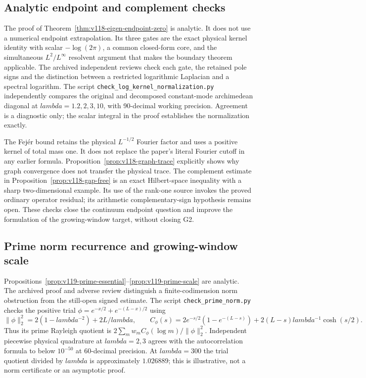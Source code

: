 \documentclass[11pt]{article}
\def\lambda{lambda}%
\theoremstyle{remark}
\begin{document}
\subsection{Analytic endpoint and complement checks}
The proof of Theorem~\ref{thm:v118-eigen-endpoint-zero} is analytic.
It does not use a numerical endpoint extrapolation. Its three gates are
the exact physical kernel identity with scalar $-\log(2\pi)$, a common
closed-form core, and the simultaneous $L^2/L^\infty$ resolvent argument
that makes the boundary theorem applicable. The archived independent
reviews check each gate, the retained pole signs and the distinction
between a restricted logarithmic Laplacian and a spectral logarithm.
The script \texttt{check\_log\_kernel\_normalization.py} independently
compares the original and decomposed constant-mode archimedean diagonal
at $\lambda=1.2,2,3,10$, with 90-decimal working precision. Agreement is
a diagnostic only; the scalar integral in the proof establishes the
normalization exactly.

The Fej\'er bound retains the physical $L^{-1/2}$ Fourier factor and
uses a positive kernel of total mass one. It does not replace the
paper's literal Fourier cutoff in any earlier formula.
Proposition~\ref{prop:v118-graph-trace} explicitly shows why graph
convergence does not transfer the physical trace.
The complement estimate in Proposition~\ref{prop:v118-gap-free}
is an exact Hilbert-space inequality with a sharp two-dimensional
example. Its use of the rank-one source invokes the proved ordinary
operator residual; its arithmetic complementary-sign hypothesis remains
open. These checks close the continuum endpoint question and improve
the formulation of the growing-window target, without closing G2.


\subsection{Prime norm recurrence and growing-window scale}
Propositions~\ref{prop:v119-prime-essential}--\ref{prop:v119-prime-scale}
are analytic. The archived proof and adverse review distinguish a
finite-codimension norm obstruction from the still-open signed estimate.
The script \texttt{check\_prime\_norm.py} checks the positive trial
$\phi=e^{-x/2}+e^{-(L-x)/2}$ using
\[
 \|\phi\|_2^2=2(1-\lambda^{-2})+2L/\lambda,
 \qquad
 C_\phi(s)=2e^{-s/2}(1-e^{-(L-s)})
             +2(L-s)\lambda^{-1}\cosh(s/2).
\]
Thus its prime Rayleigh quotient is
$2\sum_m w_m C_\phi(\log m)/\|\phi\|_2^2$.
Independent piecewise physical quadrature at $\lambda=2,3$ agrees
with the autocorrelation formula to below $10^{-50}$ at 60-decimal
precision. At $\lambda=300$ the trial quotient divided by $\lambda$
is approximately $1.026889$; this is illustrative, not a norm certificate
or an asymptotic proof.
\end{document}
